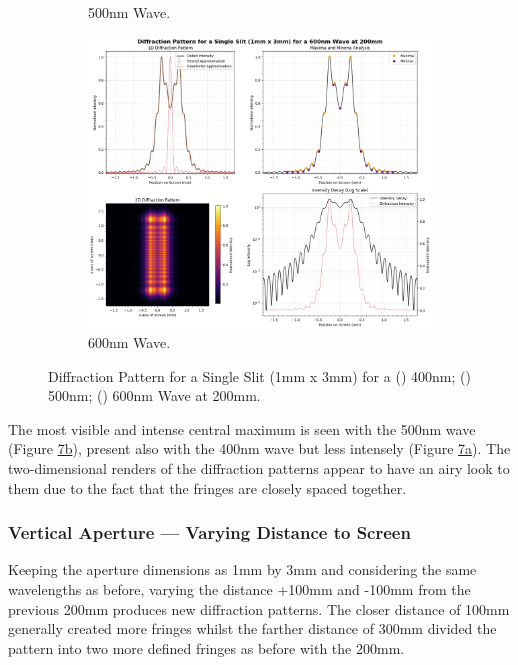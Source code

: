 \documentclass[12pt]{article}
\begin{document}
\begin{figure}[H]
\begin{subfigure}[b]{.48\textwidth}
        \caption{500nm Wave.}
        \label{fig:7b}
    \end{subfigure}
    \hspace{-.5em}
    \begin{subfigure}[b]{.48\textwidth}
        \centering
        \includegraphics[width=\linewidth]{vsslit_600nm.png}
        \caption{600nm Wave.}
        \label{fig:7c}
    \end{subfigure}
    \caption{Diffraction Pattern for a Single Slit (1mm x 3mm) for a () 400nm; () 500nm; () 600nm Wave at 200mm.}
    \label{fig:7}
\end{figure}

The most visible and intense central maximum is seen with the 500nm wave (Figure \hyperref[fig:7b]{7b}), present also with the 400nm wave but less intensely (Figure \hyperref[fig:7a]{7a}).
The two-dimensional renders of the diffraction patterns appear to have an airy look to them due to the fact that the fringes are closely spaced together.

\subsubsection{Vertical Aperture — Varying Distance to Screen}

Keeping the aperture dimensions as 1mm by 3mm and considering the same wavelengths as before, varying the distance +100mm and -100mm from the previous 200mm produces new diffraction patterns.
The closer distance of 100mm generally created more fringes whilst the farther distance of 300mm divided the pattern into two more defined fringes as before with the 200mm.
\end{document}
